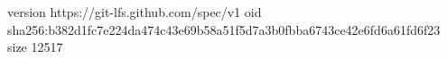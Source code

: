 version https://git-lfs.github.com/spec/v1
oid sha256:b382d1fc7e224da474c43e69b58a51f5d7a3b0fbba6743ce42e6fd6a61fd6f23
size 12517
